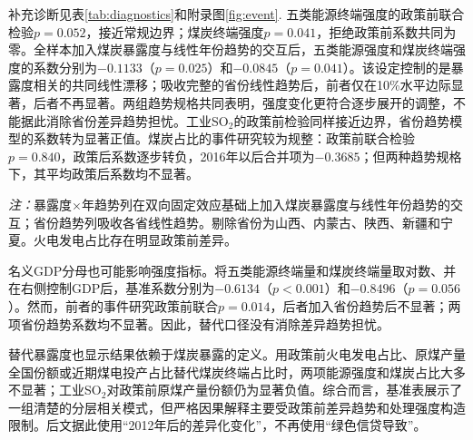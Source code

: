 \documentclass[UTF8,12pt]{ctexart}
\newcommand{\note}[1]{\begin{minipage}{0.96\textwidth}\footnotesize\textit{注：}#1\end{minipage}}
\begin{document}
补充诊断见表\ref{tab:diagnostics}和附录图\ref{fig:event}. 五类能源终端强度的政策前联合检验$p=0.052$，接近常规边界；煤炭终端强度$p=0.041$，拒绝政策前系数共同为零。全样本加入煤炭暴露度与线性年份趋势的交互后，五类能源强度和煤炭终端强度的系数分别为$-0.1133$（$p=0.025$）和$-0.0845$（$p=0.041$）。该设定控制的是暴露度相关的共同线性漂移；吸收完整的省份线性趋势后，前者仅在10\%水平边际显著，后者不再显著。两组趋势规格共同表明，强度变化更符合逐步展开的调整，不能据此消除省份差异趋势担忧。工业SO$_2$的政策前检验同样接近边界，省份趋势模型的系数转为显著正值。煤炭占比的事件研究较为规整：政策前联合检验$p=0.840$，政策后系数逐步转负，2016年以后合并项为$-0.3685$；但两种趋势规格下，其平均政策后系数均不显著。

\begin{table}[H]
\centering
\caption{事件研究与差异趋势诊断}
\label{tab:diagnostics}
\note{暴露度$\times$年趋势列在双向固定效应基础上加入煤炭暴露度与线性年份趋势的交互；省份趋势列吸收各省线性趋势。剔除省份为山西、内蒙古、陕西、新疆和宁夏。火电发电占比存在明显政策前差异。}
\end{table}

名义GDP分母也可能影响强度指标。将五类能源终端量和煤炭终端量取对数、并在右侧控制GDP后，基准系数分别为$-0.6134$（$p<0.001$）和$-0.8496$（$p=0.056$）。然而，前者的事件研究政策前联合$p=0.014$，后者加入省份趋势后不显著；两项省份趋势系数均不显著。因此，替代口径没有消除差异趋势担忧。

替代暴露度也显示结果依赖于煤炭暴露的定义。用政策前火电发电占比、原煤产量全国份额或近期煤电投产占比替代煤炭终端占比时，两项能源强度和煤炭占比大多不显著；工业SO$_2$对政策前原煤产量份额仍为显著负值。综合而言，基准表展示了一组清楚的分层相关模式，但严格因果解释主要受政策前差异趋势和处理强度构造限制。后文据此使用“2012年后的差异化变化”，不再使用“绿色信贷导致”。
\end{document}

